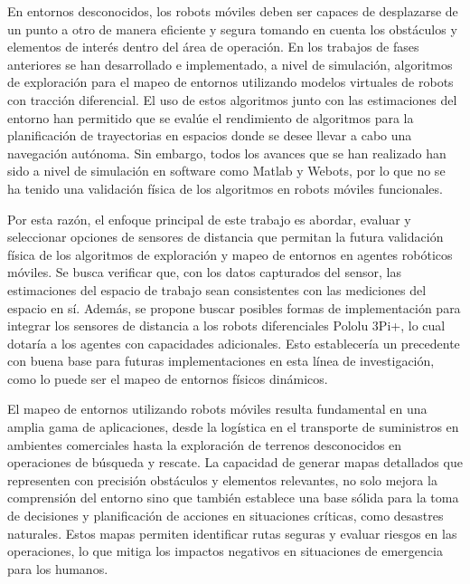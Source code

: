 En entornos desconocidos, los robots móviles deben ser capaces de desplazarse de un punto a otro de manera eficiente y segura tomando en cuenta los obstáculos y elementos de interés dentro del área de operación. En los trabajos de fases anteriores se han desarrollado e implementado, a nivel de simulación, algoritmos de exploración para el mapeo de entornos utilizando modelos virtuales de robots con tracción diferencial. El uso de estos algoritmos junto con las estimaciones del entorno han permitido que se evalúe el rendimiento de algoritmos para la planificación de trayectorias en espacios donde se desee llevar a cabo una navegación autónoma. Sin embargo, todos los avances que se han realizado han sido a nivel de simulación en software como Matlab y Webots, por lo que no se ha tenido una validación física de los algoritmos en robots móviles funcionales. 

Por esta razón, el enfoque principal de este trabajo es abordar, evaluar y seleccionar opciones de sensores de distancia que permitan la futura validación física de los algoritmos de exploración y mapeo de entornos en agentes robóticos móviles. Se busca verificar que, con los datos capturados del sensor, las estimaciones del espacio de trabajo sean consistentes con las mediciones del espacio en sí. Además, se propone buscar posibles formas de implementación para integrar los sensores de distancia a los robots diferenciales Pololu 3Pi+, lo cual dotaría a los agentes con capacidades adicionales. Esto establecería un precedente con buena base para futuras implementaciones en esta línea de investigación, como lo puede ser el mapeo de entornos físicos dinámicos.

El mapeo de entornos utilizando robots móviles resulta fundamental en una amplia gama de aplicaciones, desde la logística en el transporte de suministros en ambientes comerciales hasta la exploración de terrenos desconocidos en operaciones de búsqueda y rescate. La capacidad de generar mapas detallados que representen con precisión obstáculos y elementos relevantes, no solo mejora la comprensión del entorno sino que también establece una base sólida para la toma de decisiones y planificación de acciones en situaciones críticas, como desastres naturales. Estos mapas permiten identificar rutas seguras y evaluar riesgos en las operaciones, lo que mitiga los impactos negativos en situaciones de emergencia para los humanos.